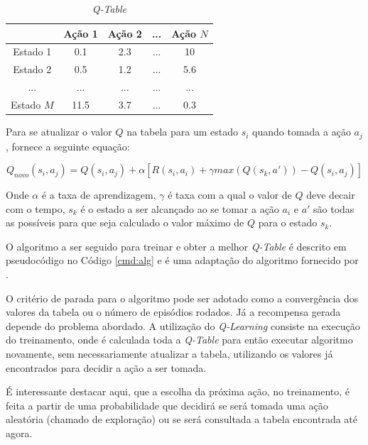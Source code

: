 \begin{table}[hbt]
    \centering
    \begin{tabular}{c|c|c|c|c}
         & Ação 1 & Ação 2 & ... & Ação $N$ \\ \hline
        Estado 1 & 0.1 & 2.3 & ... & 10 \\
        Estado 2 & 0.5 & 1.2 & ... & 5.6 \\
        ... & ... & ... & ... & ... \\
        Estado $M$ & 11.5 & 3.7 & ... & 0.3 \\
    \end{tabular}
    \caption{\textit{Q-Table}}
    \label{tab:qTable}
\end{table} 

Para se atualizar o valor $Q$ na tabela para um estado $s_i$ quando tomada a ação $a_j$,
 fornece a seguinte equação:

\begin{equation}
    Q_{novo}(s_i, a_j)=Q(s_i, a_j)+\alpha[R(s_i, a_i)+\gamma max(Q(s_k, a'))-Q(s_i, a_j)]
    \label{novoQ}
\end{equation}

Onde $\alpha$ é a taxa de aprendizagem, $\gamma$ é taxa com a qual o valor de $Q$ deve decair com o
tempo, $s_k$ é o estado a ser alcançado ao se tomar a ação $a_i$ e $a'$ são todas as possíveis para
que seja calculado o valor máximo de $Q$ para o estado $s_k$.

O algoritmo a ser seguido para treinar e obter a melhor \textit{Q-Table} é descrito em
pseudocódigo no Código \ref{cmd:alg} e é uma adaptação do algoritmo fornecido por
.


O critério de parada para o algoritmo pode ser adotado como a convergência dos valores da tabela ou
o número de episódios rodados. Já a recompensa gerada depende do problema abordado. A utilização do
\textit{Q-Learning} consiste na execução do treinamento, onde é calculada toda a
\textit{Q-Table} para então executar algoritmo novamente, sem necessariamente atualizar a tabela, utilizando os
valores já encontrados para decidir a ação a ser tomada.

É interessante destacar aqui, que a escolha da próxima ação, no treinamento, é feita a partir de uma
probabilidade que decidirá se será tomada uma ação aleatória (chamado de exploração) ou se será
consultada a tabela encontrada até agora.

